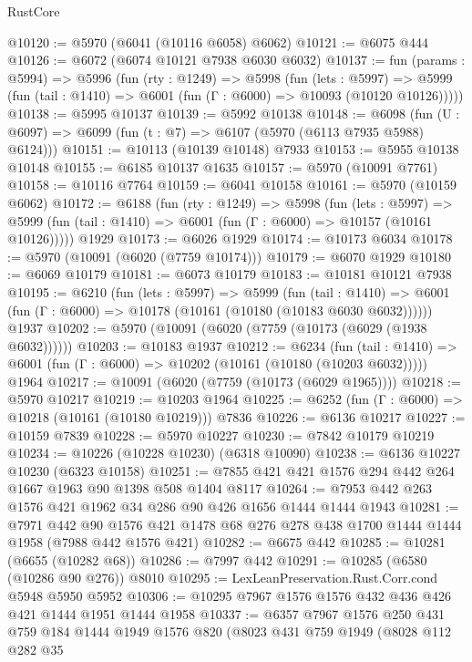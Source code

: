\begin{lexlean}{RustCore}
\begin{coremodule}
@10120 := @5970 (@6041 (@10116 @6058) @6062)
@10121 := @6075 @444
@10126 := @6072 (@6074 @10121 @7938 @6030 @6032)
@10137 := fun (params : @5994) =>
  @5996
    (fun (rty : @1249) =>
    @5998
      (fun (lets : @5997) =>
      @5999 (fun (tail : @1410) => @6001 (fun (Γ : @6000) => @10093 (@10120 @10126)))))
@10138 := @5995 @10137
@10139 := @5992 @10138
@10148 := @6098 (fun (U : @6097) => @6099 (fun (t : @7) => @6107 (@5970 (@6113 @7935 @5988) @6124)))
@10151 := @10113 (@10139 @10148) @7933
@10153 := @5955 @10138 @10148
@10155 := @6185 @10137 @1635
@10157 := @5970 (@10091 @7761)
@10158 := @10116 @7764
@10159 := @6041 @10158
@10161 := @5970 (@10159 @6062)
@10172 := @6188
    (fun (rty : @1249) =>
    @5998
      (fun (lets : @5997) =>
      @5999 (fun (tail : @1410) => @6001 (fun (Γ : @6000) => @10157 (@10161 @10126)))))
    @1929
@10173 := @6026 @1929
@10174 := @10173 @6034
@10178 := @5970 (@10091 (@6020 (@7759 @10174)))
@10179 := @6070 @1929
@10180 := @6069 @10179
@10181 := @6073 @10179
@10183 := @10181 @10121 @7938
@10195 := @6210
    (fun (lets : @5997) =>
    @5999
      (fun (tail : @1410) =>
      @6001 (fun (Γ : @6000) => @10178 (@10161 (@10180 (@10183 @6030 @6032))))))
    @1937
@10202 := @5970 (@10091 (@6020 (@7759 (@10173 (@6029 (@1938 @6032))))))
@10203 := @10183 @1937
@10212 := @6234
    (fun (tail : @1410) => @6001 (fun (Γ : @6000) => @10202 (@10161 (@10180 (@10203 @6032)))))
    @1964
@10217 := @10091 (@6020 (@7759 (@10173 (@6029 @1965))))
@10218 := @5970 @10217
@10219 := @10203 @1964
@10225 := @6252 (fun (Γ : @6000) => @10218 (@10161 (@10180 @10219))) @7836
@10226 := @6136 @10217
@10227 := @10159 @7839
@10228 := @5970 @10227
@10230 := @7842 @10179 @10219
@10234 := @10226 (@10228 @10230) (@6318 @10090)
@10238 := @6136 @10227 @10230 (@6323 @10158)
@10251 := @7855 @421 @421 @1576 @294 @442 @264 @1667 @1963 @90 @1398 @508 @1404 @8117
@10264 := @7953 @442 @263 @1576 @421 @1962 @34 @286 @90 @426 @1656 @1444 @1444 @1943
@10281 := @7971
    @442
    @90
    @1576
    @421
    @1478
    @68
    @276
    @278
    @438
    @1700
    @1444
    @1444
    @1958
    (@7988 @442 @1576 @421)
@10282 := @6675 @442
@10285 := @10281 (@6655 (@10282 @68))
@10286 := @7997 @442
@10291 := @10285 (@6580 (@10286 @90 @276)) @8010
@10295 := LexLeanPreservation.Rust.Corr.cond @5948 @5950 @5952
@10306 := @10295 @7967 @1576 @1576 @432 @436 @426 @421 @1444 @1951 @1444 @1958
@10337 := @6357
    @7967
    @1576
    @250
    @431
    @759
    @184
    @1444
    @1949
    @1576
    @820
    (@8023
      @431
      @759
      @1949
      (@8028
        @112
        @282
        @35

\end{coremodule}
\end{lexlean}
